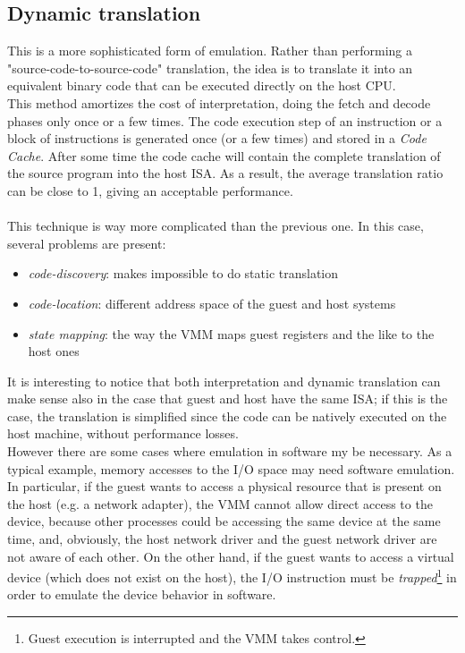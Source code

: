 \documentclass[a4paper, 12pt, titlepage]{report}
\begin{document}
\subsection{Dynamic translation} \label{subsec:dyn_tr}
This is a more sophisticated form of emulation. Rather than performing a "source-code-to-source-code" translation, the idea is to translate it into an equivalent binary code that can be executed directly on the host CPU.\\
This method amortizes the cost of interpretation, doing the fetch and decode phases only once or a few times. The code execution step of an instruction or a block of instructions is generated once (or a few times) and stored in a \textit{Code Cache}. After some time the code cache will contain the complete translation of the source program into the host ISA.\newline
As a result, the average translation ratio can be close to 1, giving an acceptable performance.
\\
\\
This technique is way more complicated than the previous one. In this case, several problems are present:
\begin{itemize}
\item \textit{code-discovery}: makes impossible to do static translation
\item \textit{code-location}: different address space of the guest and host systems
\item \textit{state mapping}: the way the VMM maps guest registers and the like to the host ones
\end{itemize}

It is interesting to notice that both interpretation and dynamic translation can make sense also in the case that guest and host have the same ISA; if this is the case, the translation is simplified since the code can be natively executed on the host machine, without performance losses.\\
However there are some cases where emulation in software my be necessary. As a typical example, memory accesses to the I/O space may need software emulation. In particular, if the guest wants to access a physical resource that is present on the host (e.g. a network adapter), the VMM cannot allow direct access to the device, because other processes could be accessing the same device at the same time, and, obviously, the host network driver and the guest network driver are not aware of each other. On the other hand, if the guest wants to access a virtual device (which does not exist on the host), the I/O instruction must be \textit{trapped}\footnote{Guest execution is interrupted and the VMM takes control.} in order to emulate the device behavior in software.
\end{document}

